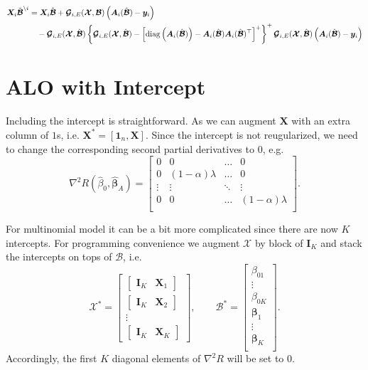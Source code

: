 \documentclass[11pt]{article}
\newcommand{\by}{\bm{y}}
\newcommand{\bI}{\bm{I}}
\newcommand{\bX}{\bm{X}}
\newcommand{\bbeta}{\bm{\beta}}
\newcommand{\bXb}{\bm{\mathcal{X}}}
\newcommand{\bBb}{\bm{\mathcal{B}}}
\begin{document}
	\begin{align*}
	\bX_i\tilde{\bm{\mathcal{B}}}^{\setminus i}&=\bX_i\hat{\bBb}+\bm{\mathcal{G}}_{i, E}(\bXb,\bBb)\left(\bm{A}_i(\hat{\bBb})-\by_i\right)\\
	&\quad-\bm{\mathcal{G}}_{i, E}(\bXb,\hat{\bBb})\left\{\bm{\mathcal{G}}_{i, E}(\bXb,\hat{\bBb})-\left[{\rm diag}\left(\bm{A}_i(\hat{\bBb})\right)-\bm{A}_i(\hat{\bBb})\bm{A}_i(\hat{\bBb})^\top\right]^{+}\right\}^{+}\bm{\mathcal{G}}_{i, E}(\bXb,\hat{\bBb})\left(\bm{A}_i(\hat{\bBb})-\by_i\right) 
	\end{align*}
	
\section{ALO with Intercept}
Including the intercept is straightforward. As we can augment \(\bX\) with an extra column of \(1\)s, i.e. \(\bX^\ast=\left[\bm{1}_n,\bm{X}\right]\). Since the intercept is not reugularized, we need to change the corresponding second partial derivatives to \(0\), e.g. \[\nabla^2R\left(\hat{\beta}_0,\hat{\bm{\beta}}_A\right)=\begin{bmatrix}
0 & 0 & \dots & 0 \\
0 & (1-\alpha)\lambda & \dots & 0\\
\vdots & \vdots & \ddots & \vdots\\
0 & 0 & \dots & (1-\alpha)\lambda \\
\end{bmatrix}.\] 

For multinomial model it can be a bit more complicated since there are now \(K\) intercepts. For programming convenience we augment \(\bXb\) by block of \(\bI_K\) and stack the intercepts on tops of \(\bBb\), i.e. \[\bXb^\ast=\begin{bmatrix}
\begin{bmatrix}
\bI_K & \bX_{1}
\end{bmatrix}\\
\begin{bmatrix}
\bI_K & \bX_{2}
\end{bmatrix}\\
\vdots\\
\begin{bmatrix}
\bI_K & \bX_{K}
\end{bmatrix}
\end{bmatrix},\qquad\bBb^\ast=\begin{bmatrix}
\beta_{01}\\
\vdots\\
\beta_{0K}\\
\bbeta_{1} \\
\vdots \\
\bbeta_{K} \\
\end{bmatrix}.\] Accordingly, the first \(K\) diagonal elements of \(\nabla^2R\) will be set to \(0\).
\end{document}

